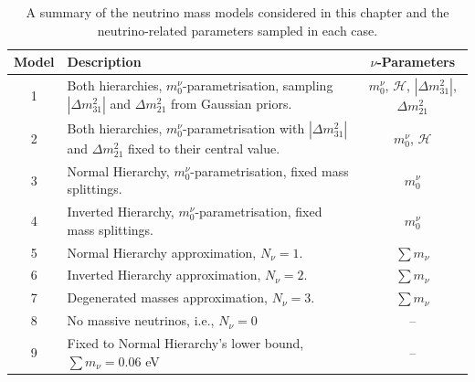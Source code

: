 \begin{table}
  \centering
  \caption{A summary of the neutrino mass models considered in this chapter and the neutrino-related parameters sampled in each case.}
  \label{Tb:Models1}
  \begin{tabular}{cp{80mm}|c}
    \hline
    \hline
    Model & Description & $\nu$-Parameters\\[0.1cm]
    \hline
    \hline
    
     1 & Both hierarchies, $m_0^{\nu}$-parametrisation, sampling $|\Delta m_{31}^2|$ and $\Delta m_{21}^2$ from Gaussian priors. &  $m_0^{\nu}$, $\mathcal{H}$, $|\Delta m_{31}^2|$, $\Delta m_{21}^2$  \\
     
     2 & Both hierarchies,  $m_0^{\nu}$-parametrisation with $|\Delta m_{31}^2|$ and $\Delta m_{21}^2$ fixed to their central value. &  $m_0^{\nu}$, $\mathcal{H}$ \\
     
     3 & Normal Hierarchy,  $m_0^{\nu}$-parametrisation, fixed mass splittings. &  $m_0^{\nu}$ \\
     
     4 & Inverted Hierarchy,  $m_0^{\nu}$-parametrisation, fixed mass splittings. &  $m_0^{\nu}$ \\
     
     \hline
     5 & Normal Hierarchy approximation, $N_{\nu}=1$.  &  $\sum m_{\nu}$ \\
     
     6 & Inverted Hierarchy approximation, $N_{\nu}=2$. &  $\sum m_{\nu}$ \\
     
     7 & Degenerated masses approximation, $N_{\nu}=3$. & $\sum m_{\nu}$ \\
     \hline
     8 & No massive neutrinos, i.e., $N_{\nu}=0$ &   -- \\
     9 & Fixed to Normal Hierarchy's lower bound, $\sum m_{\nu} = 0.06$ eV &  -- \\
     \hline
     \hline 
  \end{tabular}
\end{table}

